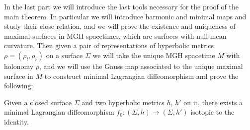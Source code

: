 In the last part we will introduce the last tools necessary for the proof of the main theorem. In particular we will introduce harmonic and minimal maps and study their close relation, and we will prove the existence and uniqueness of maximal surfaces in MGH spacetimes, which are surfaces with null mean curvature. Then given a pair of representations of hyperbolic metrics $\rho=(\rho_l, \rho_r)$ on a surface $\Sigma$ we will take the unique MGH spacetime $M$ with holonomy $\rho$, and we will use the Gauss map associated to the unique maximal surface in $M$ to construct minimal Lagrangian diffeomorphism and prove the following:
\begin{theorem*}
    Given a closed surface $\Sigma$ and two hyperbolic metrics $h$, $h'$ on it, there exists a minimal Lagrangian diffeomorphism $f_0 : (\Sigma,h) \to (\Sigma,h')$ isotopic to the identity.
\end{theorem*}